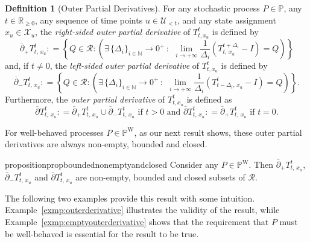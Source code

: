 \documentclass[10pt,a4paper]{paper}
\theoremstyle{definition}
\newtheorem{definition}{Definition}
\newcommand{\nats}{\mathbb{N}}
\newcommand{\reals}{\mathbb{R}}
\newcommand{\realsnonneg}{\reals_{\geq 0}}
\newcommand{\states}{\mathcal{X}}
\newcommand{\processes}{\mathbb{P}}
\newcommand{\wprocesses}{\processes^{\mathrm{W}}}
\newcommand{\coloneqq}{:\!=}
\begin{document}
\begin{definition}[Outer Partial Derivatives]\label{def:outerpartialderivatives}
For any stochastic process $P\in\processes$, any $t\in\realsnonneg$, any sequence of time points $u\in\mathcal{U}_{<t}$, and any state assignment $x_u\in\states_u$, the \emph{right-sided outer partial derivative} of $T_{t,x_u}^t$ is defined by
\begin{equation}
\overline{\partial}_{+}
{T^t_{t,\,x_u}}
\coloneqq
\left\{
Q\in\mathcal{R}
\colon
\left(\exists \,\{\Delta_i\}_{i\in\nats}\to0^+\,:\,
~
\lim_{i\to+\infty}
\frac{1}{\Delta_i}
(T^{t+\Delta_i}_{t,\,x_u}-I)
=Q
\right)
\right\}\label{eq:rightouterderivative}
\end{equation}
and, if $t\neq0$, the \emph{left-sided} \emph{outer partial derivative} of $T_{t,x_u}^t$ is defined by
\begin{equation}
\overline{\partial}_{-}
{T^t_{t,\,x_u}}
\coloneqq
\left\{
Q\in\mathcal{R}
\colon
\left(\exists\, \{\Delta_i\}_{i\in\nats}\to0^+\,:\,
~
\lim_{i\to+\infty}
\frac{1}{\Delta_i}
(T^{t}_{t-\Delta_i,\,x_u}-I)
=Q
\right)\label{eq:leftouterderivative}
\right\}.
\end{equation}
Furthermore, the \emph{outer partial derivative} of $T_{t,x_u}^t$ is defined as
\begin{equation*}
\overline{\partial}
{T^t_{t,\,x_u}}
\coloneqq
\overline{\partial}_{+}
{T^t_{t,\,x_u}}
\cup
\overline{\partial}_{-}
{T^t_{t,\,x_u}}
\text{ if $t>0$ and }
\overline{\partial}
{T^t_{t,\,x_u}}
\coloneqq
\overline{\partial}_{+}
{T^t_{t,\,x_u}}
\text{ if $t=0$}.
\end{equation*}\vspace{-10pt}
\end{definition}

For well-behaved processes $P\in\wprocesses$, as our next result shows, these outer partial derivatives are always non-empty, bounded and closed.

\begin{restatable}{proposition}{propboundednonemptyandclosed}
\label{prop:boundednon-emptyandclosed}
Consider any $P\in\wprocesses$. Then $\overline{\partial}_{+}
{T^t_{t,\,x_u}}$, $\overline{\partial}_{-}
{T^t_{t,\,x_u}}$ and $\overline{\partial}
{T^t_{t,\,x_u}}$ are non-empty, bounded and closed subsets of $\mathcal{R}$.
\end{restatable}

The following two examples provide this result with some intuition. Example~\ref{exmp:outerderivative} illustrates the validity of the result, while Example~\ref{exmp:emptyouterderivative} shows that the requirement that $P$ must be well-behaved is essential for the result to be true.
\end{document}
